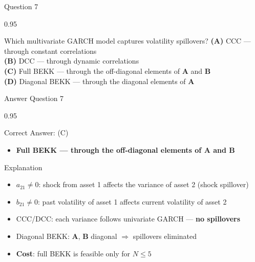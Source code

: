 \documentclass[9pt, aspectratio=169, t]{beamer}
\begin{document}
\begin{frame}{Question 7}
    \begin{cminipage}{0.95\textwidth}
    \begin{block}{Which multivariate GARCH model captures volatility spillovers?}
        \textcolor{MainBlue}{\textbf{(A)}} CCC --- through constant correlations\\[3pt]
        \textcolor{MainBlue}{\textbf{(B)}} DCC --- through dynamic correlations\\[3pt]
        \textcolor{MainBlue}{\textbf{(C)}} Full BEKK --- through the off-diagonal elements of $\mathbf{A}$ and $\mathbf{B}$\\[3pt]
        \textcolor{MainBlue}{\textbf{(D)}} Diagonal BEKK --- through the diagonal elements of $\mathbf{A}$
    \end{block}
    \end{cminipage}
\end{frame}

\begin{frame}{Answer Question 7}
    \begin{cminipage}{0.95\textwidth}
    \begin{exampleblock}{Correct Answer: (C)}
        \begin{itemize}\setlength{\itemsep}{0pt}
            \item \textbf{Full BEKK --- through the off-diagonal elements of $\mathbf{A}$ and $\mathbf{B}$}
        \end{itemize}
    \end{exampleblock}

    \pause
    \begin{block}{Explanation}
        \begin{itemize}\setlength{\itemsep}{0pt}
            \item $a_{21} \neq 0$: shock from asset 1 affects the variance of asset 2 (shock spillover)
            \item $b_{21} \neq 0$: past volatility of asset 1 affects current volatility of asset 2
            \item CCC/DCC: each variance follows univariate GARCH --- \textbf{no spillovers}
            \item Diagonal BEKK: $\mathbf{A}$, $\mathbf{B}$ diagonal $\Rightarrow$ spillovers eliminated
            \item \textbf{Cost}: full BEKK is feasible only for $N \leq 5$
        \end{itemize}
    \end{block}
    \end{cminipage}
\end{frame}
\end{document}
